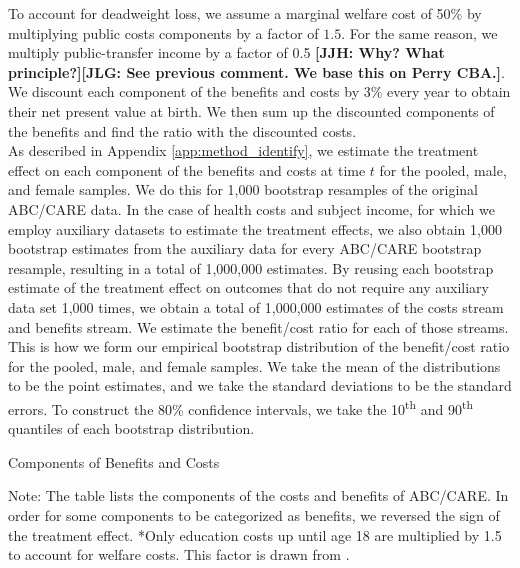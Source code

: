 \noindent To account for deadweight loss, we assume a marginal welfare cost of 50\% by multiplying
public costs components by a factor of $1.5$. For the same reason, we multiply public-transfer
income by a factor of 0.5 \textbf{[JJH: Why? What principle?]}\textbf{[JLG: See previous comment. We base this on Perry CBA.]}. We discount each component of the benefits and costs
by 3\% every year to obtain their net present value at birth. We then sum up the discounted
components of the benefits and find the ratio with the discounted costs. \\

\noindent As described in Appendix \ref{app:method_identify}, we estimate the treatment effect on each
component of the benefits and costs at time $t$ for the pooled, male, and
female samples. We do this for 1,000 bootstrap resamples of the original ABC/CARE data.
In the case of health costs and subject income, for which we employ auxiliary datasets to
estimate the treatment effects, we also obtain 1,000 bootstrap estimates from the auxiliary data
for every ABC/CARE bootstrap resample, resulting in a total of 1,000,000 estimates.
By reusing each bootstrap estimate of the treatment effect on outcomes that do not require any auxiliary data
set 1,000 times, we obtain a total of 1,000,000 estimates of the costs stream and benefits stream.
We estimate the benefit/cost ratio for each of those streams.
This is how we form our empirical bootstrap distribution of the benefit/cost ratio for the pooled, male, and female samples.
We take the mean of the distributions to be the point estimates, and we take the standard deviations
to be the standard errors. To construct the 80\% confidence intervals, we take the 10\textsuperscript{th}
and 90\textsuperscript{th} quantiles of each bootstrap distribution.

\begin{table}[H]
\begin{threeparttable}
\caption{Components of Benefits and Costs}
\label{table:bc_comp}
\centering

\begin{tablenotes}
\footnotesize
\item Note: The table lists the components of the costs and benefits of ABC/CARE.
In order for some components to be categorized as benefits, we reversed the sign
of the treatment effect. *Only education costs up until age 18 are multiplied by 1.5 to account for welfare costs. This factor is drawn from \citet{Heckman_Moon_etal_2010_RateofReturn}.
\end{tablenotes}
\end{threeparttable}
\end{table}



